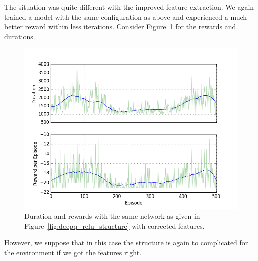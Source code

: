 \documentclass[10pt,a4paper]{article}
\begin{document}
\FloatBarrier

The situation was quite different with the improved feature extraction. We again trained a model with the same configuration as above and experienced a much better reward within less iterations. Consider Figure~\ref{fig:deep_corrected} for the rewards and durations.

\begin{figure}[!ht]
  \centering
  \includegraphics[width=1\textwidth]{./figures/relu_corrected.png}
  \caption{Duration and rewards with the same network as given in Figure~\ref{fig:deepq_relu_structure} with corrected features.}
  \label{fig:deep_corrected}
\end{figure}

However, we suppose that in this case the structure is again to complicated for the environment if we got the features right.
\end{document}
